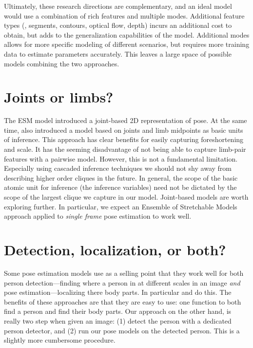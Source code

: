 Ultimately, these research directions are complementary, and an ideal model 
would use a combination of rich features and multiple modes. Additional feature 
types (\eg, segments, contours, optical flow, depth) incurs an additional cost 
to obtain, but adds to the generalization capabilities of the model. Additional 
modes allows for more specific modeling of different scenarios, but requires 
more training data to estimate parameters accurately.  This leaves a large 
space of possible models combining the two approaches.

\section{Joints or limbs?}

The ESM model introduced a joint-based 2D representation of pose.  At the same 
time, \citet{deva2011} also introduced a model based on joints and limb 
midpoints as basic units of inference.  This approach has clear benefits for 
easily capturing foreshortening and scale.  It has the seeming disadvantage of 
not being able to capture limb-pair features with a pairwise model.  However, 
this is not a fundamental limitation.  Especially using cascaded inference 
techniques we should not shy away from describing higher order cliques in the 
future.  In general, the scope of the basic atomic unit for inference (the 
inference variables) need not be dictated by the scope of the largest clique we 
capture in our model.  Joint-based models are worth exploring further.  In 
particular, we expect an Ensemble of Stretchable Models approach applied to 
{\em single frame} pose estimation to work well.

\section{Detection, localization, or both?}

Some pose estimation models use as a selling point that they work well for both 
person detection---finding where a person in at different scales in an image 
{\em and} pose estimation---localizing there body parts.  In particular 
\citet{andriluka09} and \citet{deva2011} do this.  The benefits of these 
approaches are that they are easy to use: one function to both find a person 
and find their body parts.  Our approach on the other hand, is really two step 
when given an image: (1) detect the person with a dedicated person detector, 
and (2) run our pose models on the detected person.  This is a slightly more 
cumbersome procedure. 

